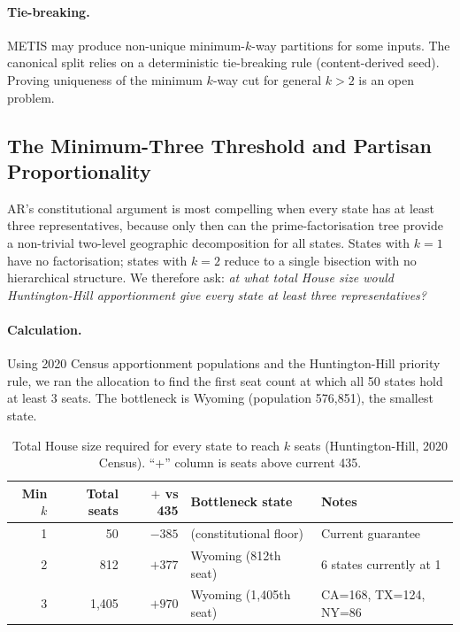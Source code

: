 \paragraph{Tie-breaking.}
METIS may produce non-unique minimum-$k$-way partitions for some inputs.
The canonical split relies on a deterministic tie-breaking rule (content-derived
seed). Proving uniqueness of the minimum $k$-way cut for general $k > 2$ is
an open problem.

\subsection{The Minimum-Three Threshold and Partisan Proportionality}
\label{sec:discussion:min3}

AR's constitutional argument is most compelling when every state has at least
three representatives, because only then can the prime-factorisation tree provide
a non-trivial two-level geographic decomposition for all states.
States with $k = 1$ have no factorisation; states with $k = 2$ reduce to a
single bisection with no hierarchical structure.
We therefore ask: \emph{at what total House size would Huntington-Hill
apportionment give every state at least three representatives?}

\paragraph{Calculation.}
Using 2020 Census apportionment populations and the Huntington-Hill priority
rule, we ran the allocation to find the first seat count at which all 50 states
hold at least 3 seats.
The bottleneck is Wyoming (population 576,851), the smallest state.

\begin{table}[h]
\centering
\caption{Total House size required for every state to reach $k$ seats
(Huntington-Hill, 2020 Census). ``+'' column is seats above current 435.}
\label{tab:min-seats}
\begin{tabular}{rrrll}
\toprule
Min $k$ & Total seats & $+$ vs 435 & Bottleneck state & Notes \\
\midrule
1 & 50  & $-385$ & (constitutional floor) & Current guarantee \\
2 & 812 & $+377$ & Wyoming (812th seat) & 6 states currently at 1 \\
3 & 1{,}405 & $+970$ & Wyoming (1{,}405th seat) & CA=168, TX=124, NY=86 \\
\bottomrule
\end{tabular}
\end{table}

